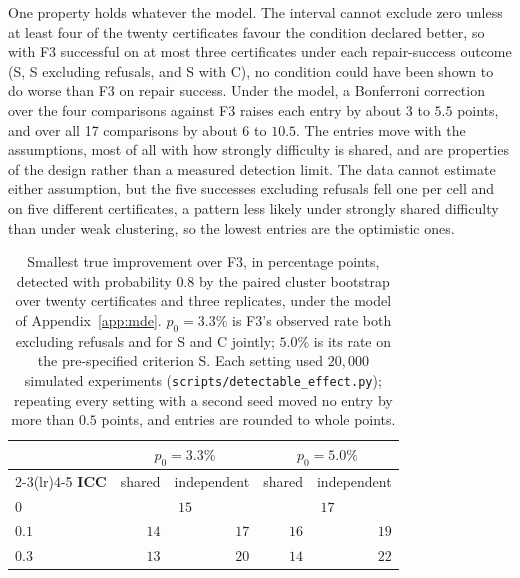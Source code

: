 \documentclass{article}
\begin{document}
One property holds whatever the model. The interval cannot exclude zero unless
at least four of the twenty certificates favour the condition declared better,
so with F3 successful on at most three certificates under each repair-success
outcome (S, S excluding refusals, and S with C), no condition could have been
shown to do worse than F3 on repair success. Under the
model, a Bonferroni correction over the four comparisons against F3 raises each
entry by about $3$ to $5.5$ points, and over all 17 comparisons by about $6$ to
$10.5$. The entries move with the assumptions, most of all with how strongly
difficulty is shared, and are properties of the design rather than a measured
detection limit. The data cannot estimate either assumption, but the five successes
excluding refusals fell one per cell and on five different certificates, a
pattern less likely under strongly shared difficulty than under weak clustering,
so the lowest entries are the optimistic ones.

\begin{table}[h]
\centering
\small
\caption{Smallest true improvement over F3, in percentage points, detected with
probability $0.8$ by the paired cluster bootstrap over twenty certificates and
three replicates, under the model of Appendix~\ref{app:mde}. $p_0=3.3\%$ is F3's
observed rate both excluding refusals and for S and C jointly; $5.0\%$ is its rate
on the pre-specified criterion S. Each setting used $20{,}000$ simulated experiments
(\texttt{scripts/detectable\_effect.py}); repeating every setting with a second
seed moved no entry by more than $0.5$ points, and entries are rounded to whole
points.}
\label{tab:mde}
\begin{tabular}{@{}lrrrr@{}}
\toprule
& \multicolumn{2}{c}{$p_0 = 3.3\%$} & \multicolumn{2}{c}{$p_0 = 5.0\%$} \\
\cmidrule(lr){2-3}\cmidrule(lr){4-5}
\textbf{ICC} & shared & independent & shared & independent \\
\midrule
$0$   & \multicolumn{2}{c}{$15$} & \multicolumn{2}{c}{$17$} \\
$0.1$ & $14$ & $17$ & $16$ & $19$ \\
$0.3$ & $13$ & $20$ & $14$ & $22$ \\
\bottomrule
\end{tabular}
\end{table}


\end{document}
